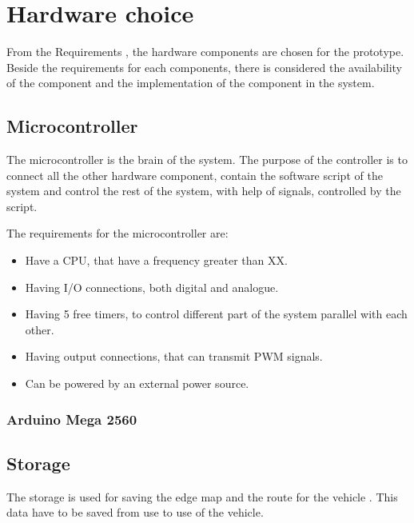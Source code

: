 \section{Hardware choice}
From the Requirements , the hardware components are chosen for the prototype. Beside the requirements for each components, there is considered the availability of the component and the implementation of the component in the system.


\subsection{Microcontroller}
The microcontroller is the brain of the system. The purpose of the controller is to connect all the other hardware component, contain the software script of the system and control the rest of the system, with help of signals, controlled by the script.

The requirements for the microcontroller are:
\begin{itemize}
\item Have a CPU, that have a frequency greater than XX. 
\item Having I/O connections, both digital and analogue.
\item Having 5 free timers, to control different part of the system parallel with each other.
\item Having output connections, that can transmit PWM signals.
\item Can be powered by an external power source.
\end{itemize} 

\subsubsection{Arduino Mega 2560}



\subsection{Storage}
The storage is used for saving the edge map and the route for the vehicle . This data have to be saved from use to use of the vehicle. 

